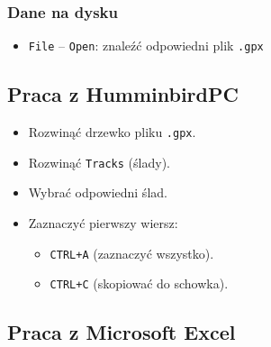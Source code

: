\documentclass[
  letterpaper,
  DIV=11,
  numbers=noendperiod]{scrreprt}
\providecommand{\tightlist}{%
  \setlength{\itemsep}{0pt}\setlength{\parskip}{0pt}}\usepackage{longtable,booktabs,array}
\begin{document}
\hypertarget{dane-na-dysku}{%
\subsubsection{Dane na dysku}\label{dane-na-dysku}}

\begin{itemize}
\tightlist
\item
  \texttt{File} -- \texttt{Open}: znaleźć odpowiedni plik \texttt{.gpx}
\end{itemize}

\hypertarget{praca-z-humminbirdpc}{%
\subsection{Praca z HumminbirdPC}\label{praca-z-humminbirdpc}}

\begin{itemize}
\tightlist
\item
  Rozwinąć drzewko pliku \texttt{.gpx}.
\item
  Rozwinąć \texttt{Tracks} (ślady).
\item
  Wybrać odpowiedni ślad.
\item
  Zaznaczyć pierwszy wiersz:

  \begin{itemize}
  \item
    \texttt{CTRL+A} (zaznaczyć wszystko).
  \item
    \texttt{CTRL+C} (skopiować do schowka).
  \end{itemize}
\end{itemize}

\hypertarget{praca-z-microsoft-excel}{%
\subsection{Praca z Microsoft Excel}\label{praca-z-microsoft-excel}}
\end{document}
